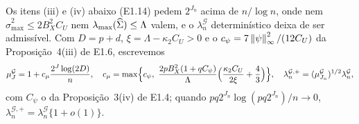 \documentclass[11pt,a4paper]{article}
\newcommand{\lmaxx}{\lambda_{\max}}
\newcommand{\smax}{\widehat{\sigma}_{\max}}
\newcommand{\Gcal}{\mathcal{G}}
\newcommand{\lamG}{\lambda^{\mathcal{G}}_{n}}
\newcommand{\lamGp}{\lambda^{\mathcal{G},+}_{n}}   %
\begin{document}
Os itens (iii) e (iv) abaixo (E1.14) pedem $2^{J_{n}}$ acima de $n/\log n$,
onde nem $\smax^{2} \le 2B_{X}^{2}C_{U}$ nem $\lmaxx(\Gramhat) \le \Lambda$
valem, e o $\lamG$ determinístico deixa de ser admissível. Com $D = p + d$,
$\xi = \Lambda - \kappa_{2}C_{U} > 0$ e o $c_{\psi} =
7\left\lVert \psi \right\rVert_{\infty}^{2}/(12C_{U})$ da Proposição~4(iii) de E1.6, escrevemos
\begin{equation}
  \label{eq:mu-blocos}
  \mu^{\Gcal}_{J} = 1 + c_{\mu}\frac{2^{J}\log(2D)}{n},
  \quad
  c_{\mu} = \max\Bigl\{c_{\psi},\
  \frac{2pB_{X}^{2}(1+qC_{\psi})}{\Lambda}
  \Bigl(\frac{\kappa_{2}C_{U}}{2\xi} + \frac43\Bigr)\Bigr\},
  \quad
  \lamGp = (\mu^{\Gcal}_{J_{n}})^{1/2}\lamG,
\end{equation}
com $C_{\psi}$ o da Proposição~3(iv) de E1.4; quando
$pq2^{J_{n}}\log(pq2^{J_{n}})/n \to 0$, $\lamGp = \lamG\{1 + o(1)\}$.
\end{document}
